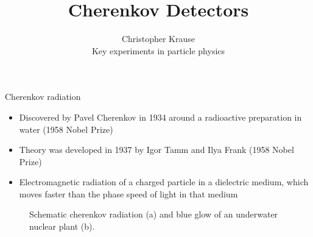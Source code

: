 \documentclass[aspectratio=1610, 10pt]{beamer}
\title{\Large{Cherenkov Detectors}}
\author[C.~Krause]{\normalsize{Christopher Krause \\
Key experiments in particle physics}}
\begin{document}
\maketitle


\begin{frame}{Cherenkov radiation}
  \begin{itemize}
    \item Discovered by Pavel Cherenkov in 1934 around a radioactive preparation in water (1958 Nobel Prize)
    \item Theory was developed in 1937 by Igor Tamm and Ilya Frank (1958 Nobel Prize)
    \item Electromagnetic radiation of a charged particle in a dielectric medium, which moves
    faster than the phase speed of light in that medium
  \end{itemize}
  \begin{figure}
      \hspace{1cm}
  \caption{Schematic cherenkov radiation (a) and blue glow of an underwater nuclear plant (b).}
  \end{figure}
\end{frame}
\end{document}
